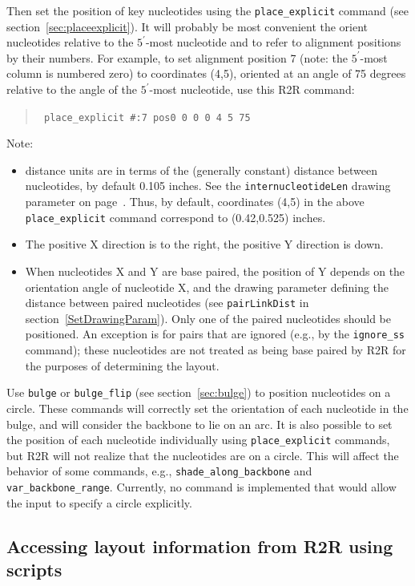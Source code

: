 \documentclass[letterpaper,12pt]{report}
\newcommand{\example}[1]{
\begin{quote}
{\raggedright
#1
}
\end{quote}
}
\newcommand{\examplett}[1]{
\example{{\tt #1}}
}
\begin{document}
Then set the position of key nucleotides using the {\tt place\_explicit} command (see section~\ref{sec:placeexplicit}).  It will probably be most convenient the orient nucleotides relative to the $5^\prime$-most nucleotide and to refer to alignment positions by their numbers.  For example, to set alignment position 7 (note: the $5^\prime$-most column is numbered zero) to coordinates (4,5), oriented at an angle of 75 degrees relative to the angle of the $5^\prime$-most nucleotide, use this R2R command:
\examplett{
place\_explicit \#:7 pos0 0 0 0 4 5 75
}

Note:
\begin{itemize}
\item distance units are in terms of the (generally constant) distance between nucleotides, by default 0.105 inches.  See the {\tt internucleotideLen} drawing parameter on page~\pageref{internucleotideLen}.  Thus, by default, coordinates (4,5) in the above {\tt place\_explicit} command correspond to (0.42,0.525) inches.
\item The positive X direction is to the right, the positive Y direction is down.
\item When nucleotides X and Y are base paired, the position of Y depends on the orientation angle of nucleotide X, and the drawing parameter defining the distance between paired nucleotides (see {\tt pairLinkDist} in section~\ref{SetDrawingParam}).  Only one of the paired nucleotides should be positioned.  An exception is for pairs that are ignored (e.g., by the {\tt ignore\_ss} command); these nucleotides are not treated as being base paired by R2R for the purposes of determining the layout.
\end{itemize}

Use {\tt bulge} or {\tt bulge\_flip} (see section~\ref{sec:bulge}) to position nucleotides on a circle.  These commands will correctly set the orientation of each nucleotide in the bulge, and will consider the backbone to lie on an arc.  It is also possible to set the position of each nucleotide individually using {\tt place\_explicit} commands, but R2R will not realize that the nucleotides are on a circle.  This will affect the behavior of some commands, e.g., {\tt shade\_along\_backbone} and {\tt var\_backbone\_range}.  Currently, no command is implemented that would allow the input to specify a circle explicitly.

\subsection{Accessing layout information from R2R using scripts}
\label{sec:dumplayout}
\end{document}
